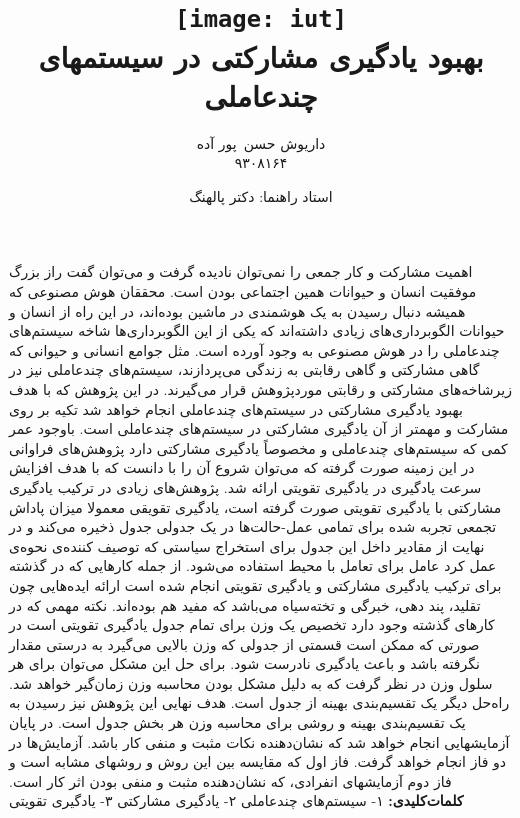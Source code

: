 \documentclass[12pt,a4paper]{article}
\begin{document}
\title{
    \texttt{[image: iut]}\\\vspace{20pt}
    بهبود یادگیری مشارکتی در سیستمهای چندعاملی\\
}
\author{
داریوش حسن\ پور آده\\
۹۳۰۸۱۶۴
}
\date{استاد راهنما: دکتر پالهنگ}
\maketitle
\newpage

اهمیت مشارکت و کار جمعی را نمی‌توان نادیده گرفت و می‌توان گفت راز بزرگ موفقیت انسان و حیوانات همین اجتماعی
بودن است. محققان هوش مصنوعی که همیشه دنبال رسیدن به یک هوشمندی در ماشین بوده‌اند، در این راه از انسان و حیوانات
الگوبرداری‌های زیادی داشته‌اند که یکی از این الگوبرداری‌ها شاخه سیستم‌های چندعاملی را در هوش مصنوعی به وجود آورده
است. مثل جوامع انسانی و حیوانی که گاهی مشارکتی و گاهی رقابتی به زندگی می‌پردازند، سیستم‌های چندعاملی نیز در
زیرشاخه‌های مشارکتی و رقابتی موردپژوهش قرار می‌گیرند. در این پژوهش که با هدف بهبود یادگیری مشارکتی در سیستم‌های
چندعاملی انجام خواهد شد تکیه‌ بر روی مشارکت و مهمتر از آن یادگیری مشارکتی در سیستم‌های چندعاملی است.
باوجود عمر کمی که سیستم‌های چندعاملی و مخصوصاً یادگیری مشارکتی دارد پژوهش‌های فراوانی در این زمینه صورت
گرفته که می‌توان شروع آن را با  دانست که با هدف افزایش سرعت یادگیری در یادگیری تقویتی ارائه شد. 
پژوهش‌های زیادی در ترکیب یادگیری مشارکتی با یادگیری تقویتی صورت گرفته است، یادگیری تقویقی معمولا میزان پاداش تجمعی تجربه شده برای تمامی عمل-حالت‌ها در یک جدولی جدول ذخیره می‌کند و در نهایت از مقادیر داخل این جدول برای استخراج سیاستی که توصیف کننده‌‌ی نحوه‌ی عمل کرد عامل برای تعامل با محیط استفاده می‌شود. از جمله کارهایی که در گذشته برای ترکیب یادگیری مشارکتی و یادگیری تقویتی انجام شده است ارائه ایده‌هایی چون تقلید، پند دهی، خبرگی و تخته‌سیاه می‌باشد که مفید هم بوده‌اند. نکته مهمی که در کارهای گذشته وجود دارد تخصیص یک وزن برای تمام جدول یادگیری تقویتی است در صورتی که ممکن است قسمتی از جدولی که وزن بالایی می‌گیرد به درستی مقدار نگرفته باشد و باعث یادگیری نادرست شود. برای حل
این مشکل می‌توان برای هر سلول وزن در نظر گرفت که به دلیل مشکل بودن محاسبه وزن زمان‌گیر خواهد شد. راه‌حل دیگر یک
تقسیم‌بندی بهینه از جدول است. هدف نهایی این پژوهش نیز رسیدن به یک تقسیم‌بندی بهینه و روشی برای محاسبه وزن هر بخش
جدول است. در پایان آزمایشهایی انجام خواهد شد که نشان‌دهنده نکات مثبت و منفی کار باشد. آزمایش‌ها در دو فاز انجام خواهد
گرفت. فاز اول که مقایسه بین این روش و روشهای مشابه است و فاز دوم آزمایشهای انفرادی، که نشان‌دهنده مثبت و منفی بودن
اثر کار است.
\vspace{1em}
\noindent\textbf{کلمات‌کلیدی:} ۱- سیستم‌های چندعاملی ۲- یادگیری مشارکتی ۳- یادگیری تقویتی
\end{document}
